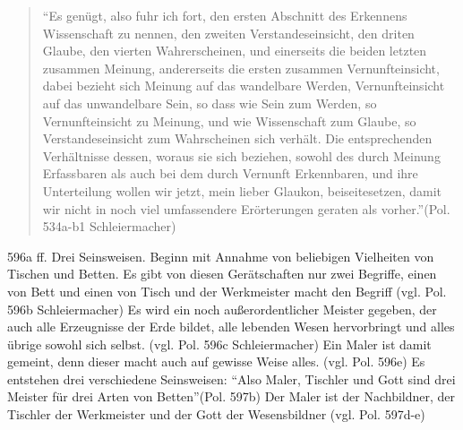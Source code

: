 \documentclass[12pt]{article}
\newcommand*{\zitatblock}[1]{%
    \begin{quote}
    \fontsize{10}{12}\selectfont
    \setlength{\parskip}{1.0em}
    #1
    \end{quote}
}
\begin{document}
\zitatblock{\enquote{Es genügt, also fuhr ich fort, den ersten Abschnitt des Erkennens Wissenschaft zu nennen, den zweiten Verstandeseinsicht, den driten Glaube, den vierten Wahrerscheinen, und einerseits die beiden letzten zusammen Meinung, andererseits die ersten zusammen Vernunfteinsicht, dabei bezieht sich Meinung auf das wandelbare Werden, Vernunfteinsicht auf das unwandelbare Sein, so dass wie Sein zum Werden, so Vernunfteinsicht zu Meinung, und wie Wissenschaft zum Glaube, so Verstandeseinsicht zum Wahrscheinen sich verhält. Die entsprechenden Verhältnisse dessen, woraus sie sich beziehen, sowohl des durch Meinung Erfassbaren als auch bei dem durch Vernunft Erkennbaren, und ihre Unterteilung wollen wir jetzt, mein lieber Glaukon, beiseitesetzen, damit wir nicht in noch viel umfassendere Erörterungen geraten als vorher.}(Pol. 534a-b1 Schleiermacher)}
596a ff. Drei Seinsweisen.
Beginn mit Annahme von beliebigen Vielheiten von Tischen und Betten. Es gibt von diesen Gerätschaften nur zwei Begriffe, einen von Bett und einen von Tisch und der Werkmeister macht den Begriff (vgl. Pol. 596b Schleiermacher)
Es wird ein noch außerordentlicher Meister gegeben, der auch alle Erzeugnisse der Erde bildet, alle lebenden Wesen hervorbringt und alles übrige sowohl sich selbst. (vgl. Pol. 596c Schleiermacher)
Ein Maler ist damit gemeint, denn dieser macht auch auf gewisse Weise alles. (vgl. Pol. 596e)
Es entstehen drei verschiedene Seinsweisen: \enquote{Also Maler, Tischler und Gott sind drei Meister für drei Arten von Betten}(Pol. 597b)
Der Maler ist der Nachbildner, der Tischler der Werkmeister und der Gott der Wesensbildner (vgl. Pol. 597d-e)
\end{document}
